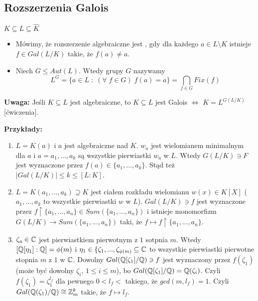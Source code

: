 \subsection{Rozszerzenia Galois}
\begin{bbox}
$K\subseteq L\subseteq\hat{K}$
\begin{itemize}
  \item[\PHtunny] Mówimy, że rozszerzenie algebraiczne jest , gdy dla każdego $a\in L\setminus K$ istnieje $f\in Gal(L/K)$ takie, że $f(a)\neq a$.
    \item[\PHtunny] Niech $G\leq Aut(L)$. Wtedy  grupy $G$ nazywamy 
    $$L^G=\{a\in L\;:\;(\forall\;f\in G)\;f(a)=a\}=\bigcap_{f\in G}Fix(f)$$
\end{itemize}
\end{bbox}

\textbf{Uwaga:} Jeśli $K\subseteq L$ jest algebraiczne, to $K\subseteq L$ jest Galois $\iff$ $K=L^{G(L/K)}$ [ćwiczenia].

\textbf{Przykłady:}
\begin{enumerate}
    \item $L=K(a)$ i $a$ jest algebraiczne nad $K$. $w_a$ jest wielomianem minimalnym dla $a$ i $a=a_1,...,a_k$ są wszystkie pierwiastki $w_a$ w $L$. Wtedy $G(L/K)\ni F$ jest wyznaczone przez $f(a)\in \{a_1,...,a_k\}$. Stąd też $|Gal(L/K)|\leq k\leq [L:K]$.
    \item $L=K(a_1,...,a_k)\supseteq K$ jest ciałem rozkładu wielomianu $w(x)\in K[X]$ ($a_1,...,a_k$ to wszystkie pierwiastki $w$ w $L$). $Gal(L/K)\ni f$ jest wyznaczone przez $f\restriction\{a_1,...,a_n\}\in Sum(\{a_1,...,a_n\})$ i istnieje monomorfizm $G(L/K)\to Sum(\{a_1,...,a_n\})$ taki, że $f\mapsto f\restriction\{a_1,...,a_n\}$.
    \item $\zeta_a\in\mathbb{C}$ jest pierwiastkiem pierwotnym z $1$ sotpnia $m$. Wtedy $[\mathbb{Q}[\eta_1]:\mathbb{Q}]=\phi(m)$ i $\eta_1\in\{\zeta_1,...,\zeta_{\phi(m)}\subseteq\mathbb{C}$ to wszystkie pierwiastki pierwotne stopnia $m$ z $1$ w $\mathbb{C}$. Dowolny $Gal(\mathbb{Q}[\zeta_1]/\mathbb{Q})\ni f$ jest wyznaczony przez $f(\zeta_1)$ (może być dowolny $\zeta_i$, $1\leq i\leq m$), bo $Gal(\mathbb{Q}[\zeta_1]/\mathbb{Q})=\mathbb{Q}(\zeta_i)$. Czyli $f(\zeta_1)=\zeta_1^{l_f}$ dla pewnego $0< l_f<$ takiego, że $gcd(m, l_f)=1$. Czyli $Gal(\mathbb{Q}(\zeta_1)/\mathbb{Q})\cong \mathbb{Z}_m^k$ takie, że $f\mapsto l_f$.
\end{enumerate}

